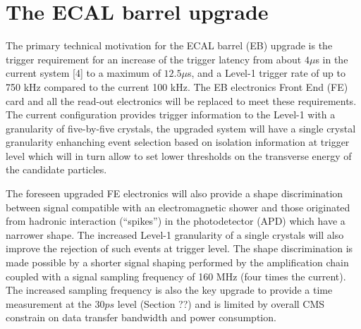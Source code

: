 \section{The ECAL barrel upgrade}
The primary technical motivation for the ECAL barrel (EB) upgrade is the trigger requirement for
an increase of the trigger latency from about $4\mu$s in the current system [4] to a maximum of $12.5\mu$s,
and a Level-1 trigger rate of up to 750 kHz compared to the current 100 kHz.
The EB electronics Front End (FE) card and all the read-out electronics will be replaced to
meet these requirements. The current configuration provides trigger information to the Level-1
with a granularity of five-by-five crystals, the upgraded system will have a single crystal granularity
enhanching event selection based on isolation information at trigger level which will in turn allow
to set lower thresholds on the transverse energy of the candidate particles.

The foreseen upgraded FE electronics will also provide a shape discrimination between
signal compatible with an electromagnetic shower and those originated from hadronic interaction (``spikes'') in
the photodetector (APD) which have a narrower shape. The increased Level-1 granularity of a single crystals
will also improve the rejection of such events at trigger level.
The shape discrimination is made possible by a shorter signal shaping performed by the amplification chain
coupled with a signal sampling frequency of 160 MHz (four times the current). The increased sampling
frequency is also the key upgrade to provide a time measurement at the $30 ps$ level (Section ??) and
is limited by overall CMS constrain on data transfer bandwidth and power consumption.


